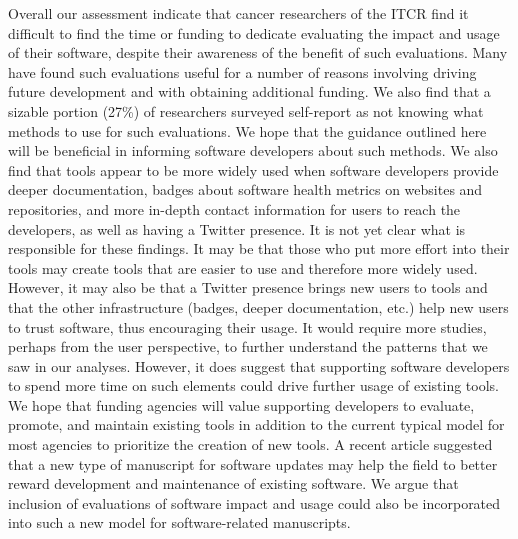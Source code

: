 \documentclass{article}
\begin{document}
Overall our assessment indicate that cancer researchers of the ITCR find it difficult to find the time or funding to dedicate evaluating the impact and usage of their software, despite their awareness of the benefit of such evaluations. Many have found such evaluations useful for a number of reasons involving driving future development and with obtaining additional funding. We also find that a sizable portion (27\%) of researchers surveyed self-report as not knowing what methods to use for such evaluations. We hope that the guidance outlined here will be beneficial in informing software developers about such methods.  We also find that tools appear to be more widely used when software developers provide deeper documentation, badges about software health metrics on websites and repositories, and more in-depth contact information for users to reach the developers, as well as having a Twitter presence. It is not yet clear what is responsible for these findings. It may be that those who put more effort into their tools may create tools that are easier to use and therefore more widely used. However, it may also be that a Twitter presence brings new users to tools and that the other infrastructure (badges, deeper documentation, etc.) help new users to trust software, thus encouraging their usage. It would require more studies, perhaps from the user perspective, to further understand the patterns that we saw in our analyses. However, it does suggest that supporting software developers to spend more time on such elements could drive further usage of existing tools. We hope that funding agencies will value supporting developers to evaluate, promote, and maintain existing tools in addition to the current typical model for most agencies to prioritize the creation of new tools. A recent article \cite{merow_better_2023} suggested that a new type of manuscript for software updates may help the field to better reward development and maintenance of existing software. We argue that inclusion of evaluations of software impact and usage could also be incorporated into such a new model for software-related manuscripts. 
\end{document}
